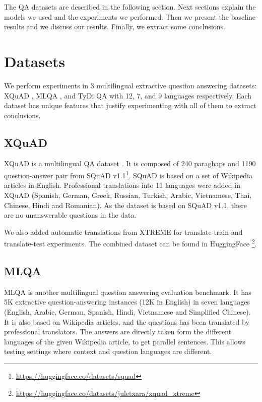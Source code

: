 \documentclass[11pt]{article}
\begin{document}
The QA datasets are described in the following section. Next sections explain the models we used and the experiments we performed. Then we present the baseline results and we discuss our results. Finally, we extract some conclusions.

\section{Datasets}

We perform experiments in 3 multilingual extractive question answering datasets: XQuAD \cite{Artetxe:etal:2019}, MLQA \cite{lewis2019mlqa}, and TyDi QA \cite{tydiqa} with 12, 7, and 9 languages respectively. Each dataset has unique features that justify experimenting with all of them to extract conclusions.

\subsection{XQuAD}

XQuAD is a multilingual QA dataset \cite{Artetxe:etal:2019}. It is composed of 240 paraghaps and 1190 question-answer pair from SQuAD v1.1\footnote{\url{https://huggingface.co/datasets/squad}}. SQuAD is based on a set of Wikipedia articles in English. Professional translations into 11 languages were added in XQuAD (Spanish, German, Greek, Russian, Turkish, Arabic, Vietnamese, Thai, Chinese, Hindi and Romanian). As the dataset is based on SQuAD v1.1, there are no unanswerable questions in the data. 

We also added automatic translations from XTREME \cite{XTREME} for translate-train and translate-test experiments. The combined dataset can be found in HuggingFace \footnote{\url{https://huggingface.co/datasets/juletxara/xquad_xtreme}}.

\subsection{MLQA}

MLQA \cite{lewis2019mlqa} is another multilingual question answering evaluation benchmark. It has 5K extractive question-answering instances (12K in English) in seven languages (English, Arabic, German, Spanish, Hindi, Vietnamese and Simplified Chinese). It is also based on Wikipedia articles, and the questions has been translated by professional translators. The answers are directly taken form the different languages of the given Wikipedia article, to get parallel sentences. This allows testing settings where context and question languages are different.
\end{document}
